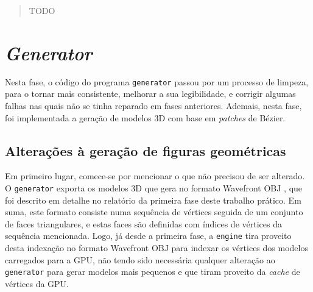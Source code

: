 \documentclass[12pt, a4paper]{article}
\begin{document}
\pagebreak

\begin{abstract}
{\color{red} TODO }
\end{abstract}

\section{\emph{Generator}}

Nesta fase, o código do programa \texttt{generator} passou por um processo de limpeza, para o tornar
mais consistente, melhorar a sua legibilidade, e corrigir algumas falhas nas quais não se tinha
reparado em fases anteriores. Ademais, nesta fase, foi implementada a geração de modelos 3D com base
em \emph{patches} de Bézier.

\subsection{Alterações à geração de figuras geométricas}

Em primeiro lugar, comece-se por mencionar o que não precisou de ser alterado. O \texttt{generator}
exporta os modelos 3D que gera no formato Wavefront OBJ \cite{wavefront-obj}, que foi descrito em
detalhe no relatório da primeira fase deste trabalho prático. Em suma, este formato consiste numa
sequência de vértices seguida de um conjunto de faces triangulares, e estas faces são definidas com
índices de vértices da sequência mencionada. Logo, já desde a primeira fase, a \texttt{engine} tira
proveito desta indexação no formato Wavefront OBJ para indexar os vértices dos modelos carregados
para a GPU, não tendo sido necessária qualquer alteração ao \texttt{generator} para gerar modelos
mais pequenos e que tiram proveito da \emph{cache} de vértices da GPU.



\end{document}
